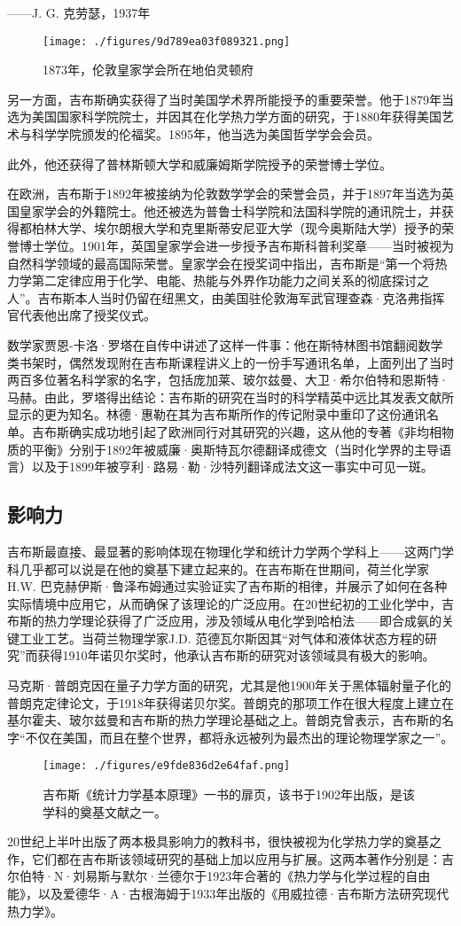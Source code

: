 ——J. G. 克劳瑟，1937年
\begin{figure}[ht]
\centering
\texttt{[image: ./figures/9d789ea03f089321.png]}
\caption{1873年，伦敦皇家学会所在地伯灵顿府} \label{fig_QSY_10}
\end{figure}
另一方面，吉布斯确实获得了当时美国学术界所能授予的重要荣誉。他于1879年当选为美国国家科学院院士，并因其在化学热力学方面的研究，于1880年获得美国艺术与科学学院颁发的伦福奖。1895年，他当选为美国哲学学会会员。

此外，他还获得了普林斯顿大学和威廉姆斯学院授予的荣誉博士学位。

在欧洲，吉布斯于1892年被接纳为伦敦数学学会的荣誉会员，并于1897年当选为英国皇家学会的外籍院士。他还被选为普鲁士科学院和法国科学院的通讯院士，并获得都柏林大学、埃尔朗根大学和克里斯蒂安尼亚大学（现今奥斯陆大学）授予的荣誉博士学位。1901年，英国皇家学会进一步授予吉布斯科普利奖章——当时被视为自然科学领域的最高国际荣誉。皇家学会在授奖词中指出，吉布斯是“第一个将热力学第二定律应用于化学、电能、热能与外界作功能力之间关系的彻底探讨之人”。吉布斯本人当时仍留在纽黑文，由美国驻伦敦海军武官理查森·克洛弗指挥官代表他出席了授奖仪式。

数学家贾恩-卡洛·罗塔在自传中讲述了这样一件事：他在斯特林图书馆翻阅数学类书架时，偶然发现附在吉布斯课程讲义上的一份手写通讯名单，上面列出了当时两百多位著名科学家的名字，包括庞加莱、玻尔兹曼、大卫·希尔伯特和恩斯特·马赫。由此，罗塔得出结论：吉布斯的研究在当时的科学精英中远比其发表文献所显示的更为知名。林德·惠勒在其为吉布斯所作的传记附录中重印了这份通讯名单。吉布斯确实成功地引起了欧洲同行对其研究的兴趣，这从他的专著《非均相物质的平衡》分别于1892年被威廉·奥斯特瓦尔德翻译成德文（当时化学界的主导语言）以及于1899年被亨利·路易·勒·沙特列翻译成法文这一事实中可见一斑。
\subsection{影响力}
吉布斯最直接、最显著的影响体现在物理化学和统计力学两个学科上——这两门学科几乎都可以说是在他的奠基下建立起来的。在吉布斯在世期间，荷兰化学家H.W. 巴克赫伊斯·鲁泽布姆通过实验证实了吉布斯的相律，并展示了如何在各种实际情境中应用它，从而确保了该理论的广泛应用。在20世纪初的工业化学中，吉布斯的热力学理论获得了广泛应用，涉及领域从电化学到哈柏法——即合成氨的关键工业工艺。当荷兰物理学家J.D. 范德瓦尔斯因其“对气体和液体状态方程的研究”而获得1910年诺贝尔奖时，他承认吉布斯的研究对该领域具有极大的影响。

马克斯·普朗克因在量子力学方面的研究，尤其是他1900年关于黑体辐射量子化的普朗克定律论文，于1918年获得诺贝尔奖。普朗克的那项工作在很大程度上建立在基尔霍夫、玻尔兹曼和吉布斯的热力学理论基础之上。普朗克曾表示，吉布斯的名字“不仅在美国，而且在整个世界，都将永远被列为最杰出的理论物理学家之一”。
\begin{figure}[ht]
\centering
\texttt{[image: ./figures/e9fde836d2e64faf.png]}
\caption{吉布斯《统计力学基本原理》一书的扉页，该书于1902年出版，是该学科的奠基文献之一。} \label{fig_QSY_11}
\end{figure}
20世纪上半叶出版了两本极具影响力的教科书，很快被视为化学热力学的奠基之作，它们都在吉布斯该领域研究的基础上加以应用与扩展。这两本著作分别是：吉尔伯特·N·刘易斯与默尔·兰德尔于1923年合著的《热力学与化学过程的自由能》，以及爱德华·A·古根海姆于1933年出版的《用威拉德·吉布斯方法研究现代热力学》。

